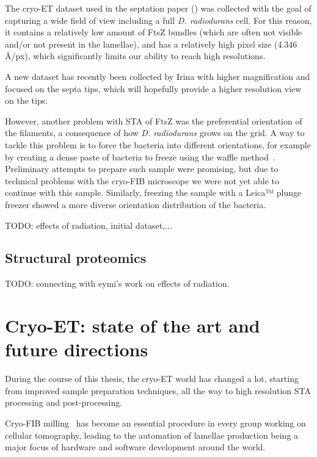 The cryo-ET dataset used in the septation paper () was collected with the goal of capturing a wide field of view including a full \textit{D. radiodurans} cell.
For this reason, it contains a relatively low amount of FtsZ bundles (which are often not visible and/or not present in the lamellae), and has a relatively high pixel size (4.346 Å/px), which significantly limits our ability to reach high resolutions.

A new dataset has recently been collected by Irina with higher magnification and focused on the septa tips, which will hopefully provide a higher resolution view on the tips.

However, another problem with STA of FtsZ was the preferential orientation of the filaments, a consequence of how \textit{D. radiodurans} grows on the grid.
A way to tackle this problem is to force the bacteria into different orientations, for example by creating a dense paste of bacteria to freeze using the waffle method~\cite{kelleyWaffleMethodGeneral2022}.
Preliminary attempts to prepare such sample were promising, but due to technical problems with the cryo-FIB microscope we were not yet able to continue with this sample.
Similarly, freezing the sample with a Leica™ plunge freezer showed a more diverse orientation distribution of the bacteria.

TODO: effects of radiation, initial dataset,...

\subsection{Structural proteomics}

TODO: connecting with eymi's work on effects of radiation.


\section{Cryo-ET: state of the art and future directions}

During the course of this thesis, the cryo-ET world has changed a lot, starting from improved sample preparation techniques, all the way to high resolution STA processing and post-processing.

Cryo-FIB milling~\cite{markoFocusedionbeamThinningFrozenhydrated2007} has become an essential procedure in every group working on cellular tomography, leading to the automation of lamellae production being a major focus of hardware and software development around the world.

